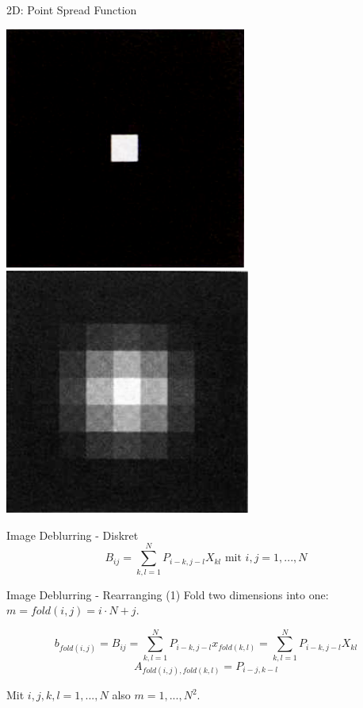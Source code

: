 \documentclass[11pt]{beamer}
\begin{document}
\begin{frame}{2D: Point Spread Function}
\begin{center}
\includegraphics[scale=0.5]{psf_pre}
\mbox{}
\mbox{}
\includegraphics[scale=0.491]{psf_post}
\end{center}
\end{frame}



\begin{frame}{Image Deblurring - Diskret}
\[
B_{ij} = \sum\limits_{k, l = 1}^N P_{i-k,j-l} X_{kl}
\mbox{ mit } i, j = 1, ..., N
\]
\end{frame}


\begin{frame}{Image Deblurring - Rearranging (1)}
Fold two dimensions into one: $m = fold(i, j) = i \cdot N + j$.

\[
b_{fold(i, j)} = B_{ij} = \sum\limits_{k, l = 1}^N P_{i-k,j-l} x_{fold(k, l)} = \sum\limits_{k, l = 1}^N P_{i-k,j-l} X_{kl}
\]
\[
A_{fold(i,j),fold(k,l)} = P_{i-j, k-l}
\]

Mit $i, j, k, l = 1, ..., N$ also $m = 1, ..., N^2$.
\end{frame}
\end{document}
